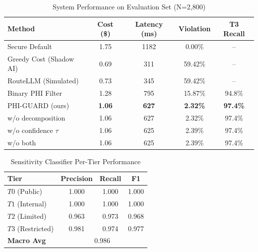 \begin{table}[t]
\centering
\caption{System Performance on Evaluation Set (N=2{,}800)}
\label{tab:results}
\begin{tabular}{@{}lcccc@{}}
\toprule
\textbf{Method} & \textbf{Cost (\$)} & \textbf{Latency (ms)} & \textbf{Violation} & \textbf{T3 Recall} \\
\midrule
Secure Default & 1.75 & 1182 & 0.00\% & -- \\
Greedy Cost (Shadow AI) & 0.69 & 311 & 59.42\% & -- \\
RouteLLM (Simulated) & 0.73 & 345 & 59.42\% & -- \\
Binary PHI Filter & 1.28 & 795 & 15.87\% & 94.8\% \\
\midrule
PHI-GUARD (ours) & \textbf{1.06} & \textbf{627} & \textbf{2.32\%} & \textbf{97.4\%} \\
\quad w/o decomposition & 1.06 & 627 & 2.32\% & 97.4\% \\
\quad w/o confidence $\tau$ & 1.06 & 625 & 2.39\% & 97.4\% \\
\quad w/o both & 1.06 & 625 & 2.39\% & 97.4\% \\
\bottomrule
\end{tabular}
\end{table}

\begin{table}[t]
\centering
\caption{Sensitivity Classifier Per-Tier Performance}
\label{tab:classifier}
\begin{tabular}{@{}lccc@{}}
\toprule
\textbf{Tier} & \textbf{Precision} & \textbf{Recall} & \textbf{F1} \\
\midrule
$T0$ (Public) & 1.000 & 1.000 & 1.000 \\
$T1$ (Internal) & 1.000 & 1.000 & 1.000 \\
$T2$ (Limited) & 0.963 & 0.973 & 0.968 \\
$T3$ (Restricted) & 0.981 & 0.974 & 0.977 \\
\midrule
\textbf{Macro Avg} & \multicolumn{3}{c}{0.986} \\
\bottomrule
\end{tabular}
\end{table}